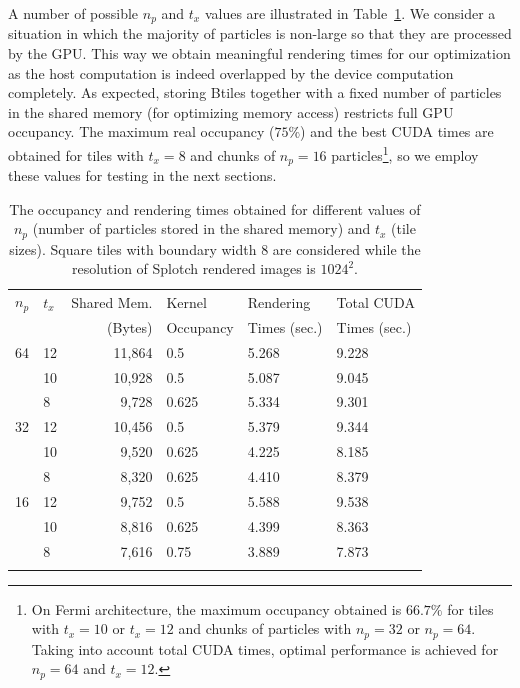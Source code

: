 \documentclass[preprint,5pt]{elsarticle}
\begin{document}
A number of possible $n_p$ and $t_x$ values are illustrated in Table~\ref{tab:tuning}. We consider a situation in which the majority of particles is non-large so that they are processed by the GPU. This way we obtain meaningful rendering times for our optimization as the host computation is indeed overlapped by the device computation completely. As expected, storing Btiles together with a fixed number of particles in the shared memory (for optimizing memory access) restricts full GPU occupancy. The maximum real occupancy ($75\%$) and the best CUDA times are obtained for tiles with $t_x = 8$ and chunks of  $n_p = 16$ particles\footnote{On Fermi architecture, the maximum occupancy obtained is $66.7\%$ for tiles with $t_x = 10$ or $t_x = 12$ and chunks of particles with $n_p = 32$ or $n_p=64$. Taking into account total CUDA times, optimal performance is achieved for $n_p=64$ and $t_x = 12$.}, so we employ these values for testing in the next sections.

\begin{table}
\label{tab:tuning}
\begin{tabular}{llrlll}
\hline \noalign{\smallskip}
$n_p$ & $t_x$ & Shared Mem. & Kernel & Rendering & Total CUDA \\
            & & (Bytes) & Occupancy & Times (sec.) & Times (sec.) \\
\noalign{\smallskip} \hline \noalign{\smallskip}
64   & 12 & 11,864 & 0.5 & 5.268 & 9.228 \\
      & 10 & 10,928 & 0.5 & 5.087  & 9.045 \\
      & 8 & 9,728 & 0.625 & 5.334  & 9.301 \\
32   & 12 & 10,456 & 0.5 & 5.379 & 9.344 \\
      & 10 & 9,520 & 0.625 & 4.225  & 8.185 \\
      & 8 & 8,320 & 0.625 & 4.410  & 8.379 \\
16  & 12 & 9,752 & 0.5 & 5.588 & 9.538 \\
      & 10 & 8,816 & 0.625 & 4.399 & 8.363 \\
      & 8 & 7,616 & 0.75 & 3.889 & 7.873 \\
\noalign{\smallskip} \hline
\end{tabular}
\caption{The occupancy and rendering times obtained for different values of $n_p$ (number of particles stored in the shared memory) and $t_x$ (tile sizes). Square tiles with boundary width 8 are considered while the resolution of Splotch rendered images is $1024^{2}.$}
\end{table}
\end{document}
